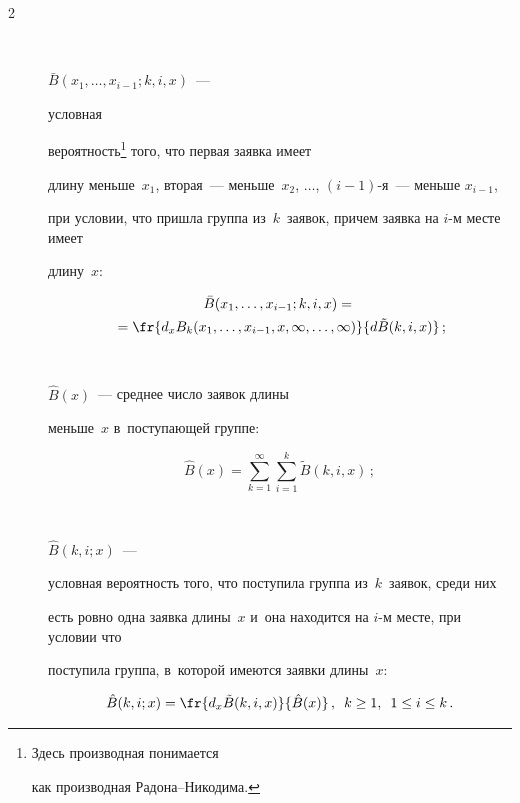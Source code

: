 \begin{multicols}{2}
\begin{description}
\item[\,] ${\bar B}(x_1,\dots,x_{i-1};k,i,x)$~---


условная 


вероятность\footnote{Здесь производная понимается


как производная Ра\-до\-на--Ни\-ко\-ди\-ма.} того, что первая заявка имеет


длину меньше~$x_1$, вторая~--- меньше~$x_2$, $\dots$, $(i-1)$-я~--- меньше $x_{i-1}$,


при условии, что пришла группа из~$k$~заявок, причем заявка на $i$-м месте имеет


длину~$x$:


\begin{multline*}


{\bar B}(x_1,\dots,x_{i-1};k,i,x)={}\\


{}=\fr{d_x B_k(x_1,\dots,x_{i-1},x,\infty, 


\dots, \infty)}{d {\tilde B}(k,i,x)}\,;


\end{multline*} 





\item[\,] ${\hat B}(x)$~---  среднее число заявок длины


меньше~$x$ в~поступающей группе:


$$


{\hat B}(x) = \sum\limits_{k=1}^\infty 


\sum\limits_{i=1}^k {\tilde B}(k,i,x)\,;


$$





\item[\,] ${\hat B}(k,i;x)$~---


условная вероятность того, что поступила группа из~$k$~заявок, среди них


есть ровно одна заявка длины~$x$ и~она находится на $i$-м месте, при условии что


поступила группа, в~которой имеются заявки длины~$x$:


$$


{\hat B}(k,i;x)=\fr{d_x {\tilde B}(k,i,x)}{{\hat B}(x)}\,, \enskip


k \ge 1,\enskip 1 \le i \le k\,.


$$






\end{description}
\end{multicols}

